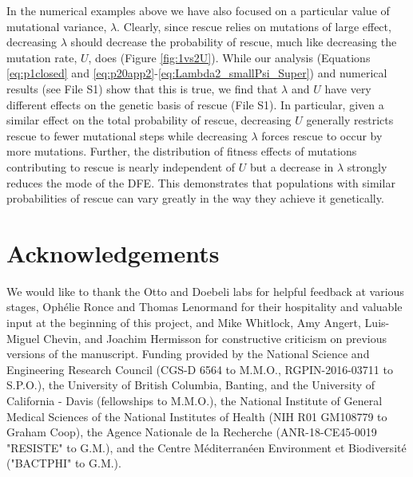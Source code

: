 \documentclass[9pt,twocolumn,twoside,lineno]{gsajnl}
\begin{document}
In the numerical examples above we have also focused on a particular value of mutational variance, $\lambda$. 
Clearly, since rescue relies on mutations of large effect, decreasing $\lambda$ should decrease the probability of rescue, much like decreasing the mutation rate, $U$, does (Figure \ref{fig:1vs2U}).
While our analysis (Equations \ref{eq:p1closed} and \ref{eq:p20app2}-\ref{eq:Lambda2_smallPsi_Super}) and numerical results (see File S1) show that this is true, we find that $\lambda$ and $U$ have very different effects on the genetic basis of rescue (File S1).
In particular, given a similar effect on the total probability of rescue, decreasing $U$ generally restricts rescue to fewer mutational steps while decreasing $\lambda$ forces rescue to occur by more mutations.
Further, the distribution of fitness effects of mutations contributing to rescue is nearly independent of $U$ but a decrease in $\lambda$ strongly reduces the mode of the DFE. 
This demonstrates that populations with similar probabilities of rescue can vary greatly in the way they achieve it genetically.

\section{Acknowledgements}

We would like to thank the Otto and Doebeli labs for helpful feedback at various stages, Oph\'{e}lie Ronce and Thomas Lenormand for their hospitality and valuable input at the beginning of this project, and Mike Whitlock, Amy Angert, Luis-Miguel Chevin, and Joachim Hermisson for constructive criticism on previous versions of the manuscript.
Funding provided by the National Science and Engineering Research Council (CGS-D 6564 to M.M.O., RGPIN-2016-03711 to S.P.O.), the University of British Columbia, Banting, and the University of California - Davis (fellowships to M.M.O.), the National Institute of General Medical Sciences of the National Institutes of Health (NIH R01 GM108779 to Graham Coop), the Agence Nationale de la Recherche (ANR-18-CE45-0019 "RESISTE" to G.M.), and the Centre M\'{e}diterran\'{e}en Environment et Biodiversit\'{e} ("BACTPHI" to G.M.).



\end{document}
